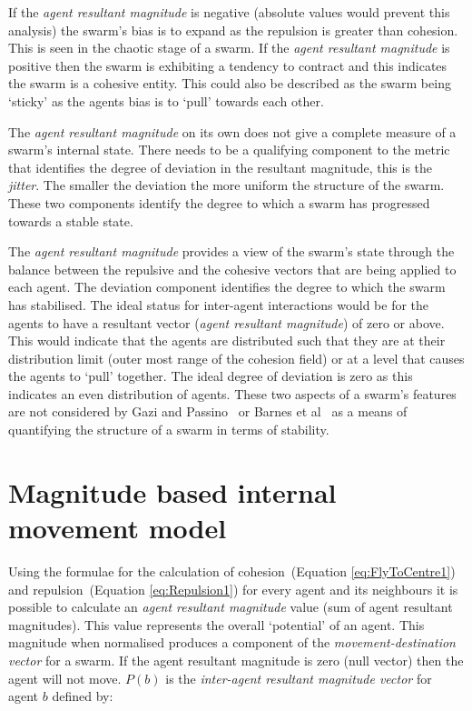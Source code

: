 \documentclass[10pt,journal,letterpaper,twoside]{IEEEtran}
\begin{document}
If the \textit{agent resultant magnitude} is negative (absolute values would prevent this analysis) the swarm's bias is to expand as the repulsion is greater than cohesion. This is seen in the chaotic stage of a swarm. If the \textit{agent resultant magnitude} is positive then the swarm is exhibiting a tendency to contract and this indicates the swarm is a cohesive entity. This could also be described as the swarm being `sticky' as the agents bias is to `pull' towards each other.

The \textit{agent resultant magnitude} on its own does not give a complete measure of a swarm's internal state. There needs to be a qualifying component to the metric  that identifies the degree of deviation in the resultant magnitude, this is the \textit{jitter}. The smaller the deviation the more uniform the structure of the swarm. These two components identify the degree to which a swarm has progressed towards a stable state.
 
The \textit{agent resultant magnitude} provides a view of the swarm's state through the balance between the repulsive and the cohesive vectors that are being applied to each agent. The deviation component identifies the degree to which the swarm has stabilised. The ideal status for inter-agent interactions would be for the agents to have a resultant vector (\textit{agent resultant magnitude}) of zero or above. This would indicate that the agents are distributed such that they are at their distribution limit (outer most range of the cohesion field) or at a level that causes the agents to `pull' together. The ideal degree of deviation is zero as this indicates an even distribution of agents. These two aspects of a swarm's features are not considered by Gazi and Passino~\cite{GP:11} or Barnes et al~\cite{BFV:07} as a means of quantifying the structure of a swarm in terms of stability.

\section{Magnitude based internal movement model}\label{Section:StabilityModel}
Using the formulae for the calculation of cohesion~(Equation \ref{eq:FlyToCentre1}) and repulsion~(Equation \ref{eq:Repulsion1}) for every agent and its neighbours it is possible to calculate an \textit{agent resultant magnitude} value (sum of agent resultant magnitudes). This value represents the overall `potential' of an agent. This magnitude when normalised produces a component of the \textit{movement-destination vector} for a swarm. If the agent resultant magnitude is zero (null vector) then the agent will not move. $P(b)$ is the \textit{inter-agent resultant magnitude vector} for agent $b$ defined by:
\end{document}
